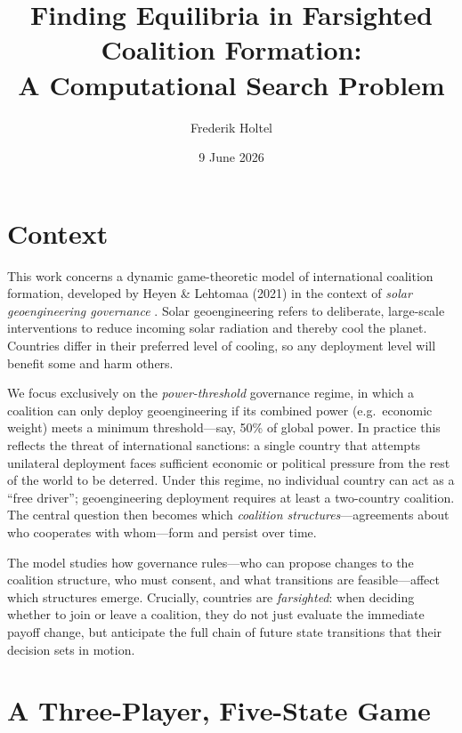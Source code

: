 \documentclass[11pt]{article}
\title{Finding Equilibria in Farsighted Coalition Formation:\\A Computational Search Problem}
\author{Frederik Holtel}
\date{9 June 2026}
\begin{document}
\maketitle

\section*{Context}

This work concerns a dynamic game-theoretic model of international coalition formation, developed
by Heyen \& Lehtomaa (2021) in the context of \emph{solar geoengineering governance}
\cite{heyen2021}. Solar geoengineering refers to deliberate, large-scale interventions to reduce
incoming solar radiation and thereby cool the planet. Countries differ in their preferred level of
cooling, so any deployment level will benefit some and harm others.

We focus exclusively on the \emph{power-threshold} governance regime, in which a coalition can
only deploy geoengineering if its combined power (e.g.\ economic weight) meets a minimum
threshold---say, 50\% of global power. In practice this reflects the threat of international
sanctions: a single country that attempts unilateral deployment faces sufficient economic or
political pressure from the rest of the world to be deterred. Under this regime, no individual
country can act as a ``free driver''; geoengineering deployment requires at least a two-country
coalition. The central question then becomes which \emph{coalition structures}---agreements about
who cooperates with whom---form and persist over time.

The model studies how governance rules---who can propose changes to the coalition structure, who
must consent, and what transitions are feasible---affect which structures emerge. Crucially,
countries are \emph{farsighted}: when deciding whether to join or leave a coalition, they do not
just evaluate the immediate payoff change, but anticipate the full chain of future state
transitions that their decision sets in motion.

\section{A Three-Player, Five-State Game}
\end{document}
